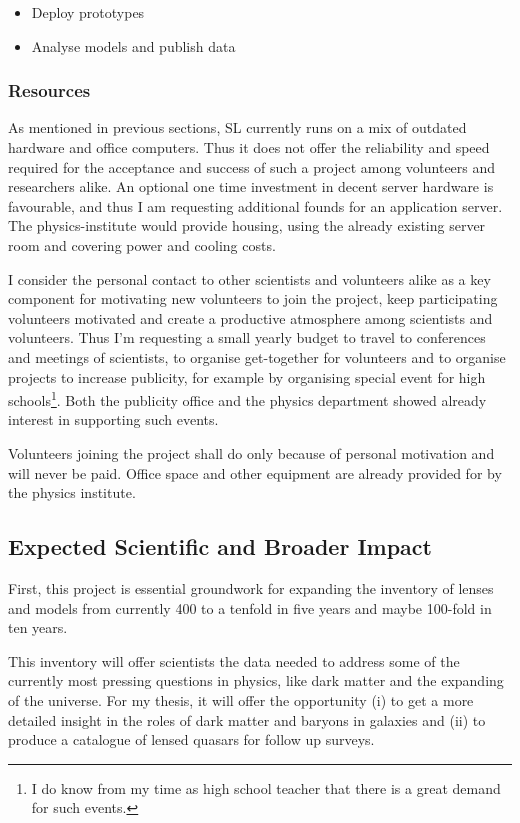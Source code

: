 \documentclass[11pt]{article}
\begin{document}
\begin{itemize}
  \item Deploy prototypes
  \item Analyse models and publish data
\end{itemize}


\subsubsection{Resources}

As mentioned in previous sections, SL currently runs on a mix of outdated hardware and office computers.
Thus it does not offer the reliability and speed required for the acceptance and success of such a project among volunteers and researchers alike.
An optional one time investment in decent server hardware is favourable, and thus I am requesting additional founds for an application server.
The physics-institute would provide housing, using the already existing server room and covering power and cooling costs.

I consider the personal contact to other scientists and volunteers alike as a key component for motivating new volunteers to join the project, keep participating volunteers motivated and create a productive atmosphere among scientists and volunteers.
Thus I'm requesting a small yearly budget to travel to conferences and meetings of scientists, to organise get-together for volunteers and to organise projects to increase publicity, for example by organising special event for high schools\footnote{I do know from my time as high school teacher that there is a great demand for such events.}. Both the publicity office and the physics department showed already interest in supporting such events.

Volunteers joining the project shall do only because of personal motivation and will never be paid.
Office space and other equipment are already provided for by the physics institute.




\subsection{Expected Scientific and Broader Impact}

First, this project is essential groundwork for expanding the inventory of lenses and models from currently 400 to a tenfold in five years and maybe 100-fold in ten years.

This inventory will offer scientists the data needed to address some of the currently most pressing questions in physics, like dark matter and the expanding of the universe.
For my thesis, it will offer the opportunity (i) to get a more detailed insight in the roles of dark matter and baryons in galaxies and (ii) to produce a catalogue of lensed quasars for follow up surveys.
\end{document}
